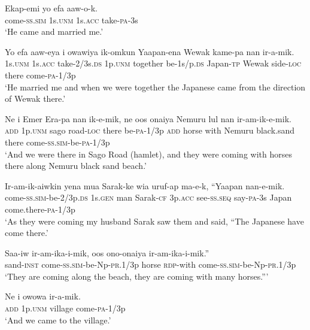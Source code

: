 \ea\label{ex:a:x5}
\gll  Ekap-emi  yo  efa  aaw-o-k. \\
come-\textsc{ss}.\textsc{sim}  1s.\textsc{unm}  1s.\textsc{acc}  take-\textsc{pa}-3s \\
\glt ‘He came and married me.’ \\
\z


\ea\label{ex:a:x6}
\gll  Yo  efa  aaw-eya  i  owawiya  ik-omkun   Yaapan-ena  Wewak  kame-pa  nan  ir-a-mik. \\
1s.\textsc{unm}  1s.\textsc{acc}  take-2/3s.\textsc{ds}  1p.\textsc{unm}  together  be-1s/p.\textsc{ds}  Japan-\textsc{tp}  Wewak  side-\textsc{loc}  there  come-\textsc{pa}-1/3p \\
\glt ‘He married me and when we were together the Japanese came from the direction of Wewak there.’ \\
\z


\ea\label{ex:a:x7}
\gll  Ne  i  Emer  Era-pa  nan  ik-e-mik,  ne  oos   onaiya  Nemuru  lul  nan  ir-am-ik-e-mik. \\
\textsc{add}  1p.\textsc{unm}  sago  road-\textsc{loc}  there  be-\textsc{pa}-1/3p  \textsc{add}  horse with  Nemuru  black.sand  there  come-\textsc{ss}.\textsc{sim}-be-\textsc{pa}-1/3p \\
\glt ‘And we were there in Sago Road (hamlet), and they were coming with horses there along Nemuru black sand beach.’ \\
\z


\ea\label{ex:a:x8}
\gll  Ir-am-ik-aiwkin  yena  mua  Sarak-ke  wia  uruf-ap  ma-e-k,  “Yaapan  nan-e-mik. \\
come-\textsc{ss}.\textsc{sim}-be-2/3p.\textsc{ds}  1s.\textsc{gen}  man  Sarak-\textsc{cf}  3p.\textsc{acc}   see-\textsc{ss.seq}  say-\textsc{pa}-3s  Japan  come.there-\textsc{pa}-1/3p \\
\glt ‘As they were coming my husband Sarak saw them and said, “The Japanese have come there.’ \\
\z


\ea\label{ex:a:x9}
\gll  Saa-iw  ir-am-ika-i-mik,  oos  ono-onaiya       ir-am-ika-i-mik.” \\
sand-\textsc{inst}  come-\textsc{ss}.\textsc{sim}-be-Np-\textsc{pr}.1/3p  horse  \textsc{rdp}-with come-\textsc{ss}.\textsc{sim}-be-Np-\textsc{pr}.1/3p \\
\glt ‘They are coming along the beach, they are coming with many horses.”’ \\
\z


\ea\label{ex:a:x10}
\gll  Ne  i  owowa  ir-a-mik. \\
\textsc{add}  1p.\textsc{unm}  village  come-\textsc{pa}-1/3p \\
\glt ‘And we came to the village.’ \\
\z


